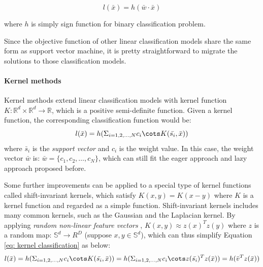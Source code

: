 \begin{equation}
    l(\bar{x}) = h(\bar{w}\cdot\bar{x})
\end{equation}


where $h$ is simply sign function for binary classification problem.

Since the objective function of other linear classification models share the same form as support vector machine, it is pretty straightforward to migrate the solutions to those classification models.

\paragraph{Kernel methods}
Kernel methods extend linear classification models with kernel function $K: \mathbb{R}^d \times \mathbb{R}^d \rightarrow \mathbb{R}$, which is a positive semi-definite function. Given a kernel function, the corresponding classification function would be:
\begin{equation}\label{eq: kernel classification}
    l(\bar{x})=h(\Sigma_{i=1,2,\dots,N}c_i\cots K(\bar{s_i}, \bar{x}))
\end{equation}
where $\bar{s}_i$ is the {\em support vector} and $c_i$ is the weight value. In this case, the weight vector $\bar{w}$ is: $\bar{w} = \{c_1, c_2,\dots, c_N\}$, which can still fit the eager approach and lazy approach proposed before.

Some further improvements can be applied to a special type of kernel functions called shift-invariant kernels, which satisfy $K(x, y) = K(x-y)$ where $K$ is a kernel function and regarded as a simple function. Shift-invariant kernels includes many common kernels, such as the Gaussian and the Laplacian kernel. By applying {\em random non-linear feature vectors} \cite{rahimi2008random}, $K(x, y) \approx z(x)^Tz(y)$ where $z$ is a random map: $\mathbb{S}^d \rightarrow R^D$ (suppose $x, y \in \mathbb{S}^d$), which can thus simplify Equation \ref{eq: kernel classification} as below:
\begin{equation}
    l(\bar{x})=h(\Sigma_{i=1,2,\dots,N}c_i\cots K(\bar{s_i}, \bar{x})) = h(\Sigma_{i=1,2,\dots,N}c_i\cots z(\bar{s_i})^Tz(\bar{x}))=h(\bar{v}^Tz(\bar{x}))
\end{equation}

